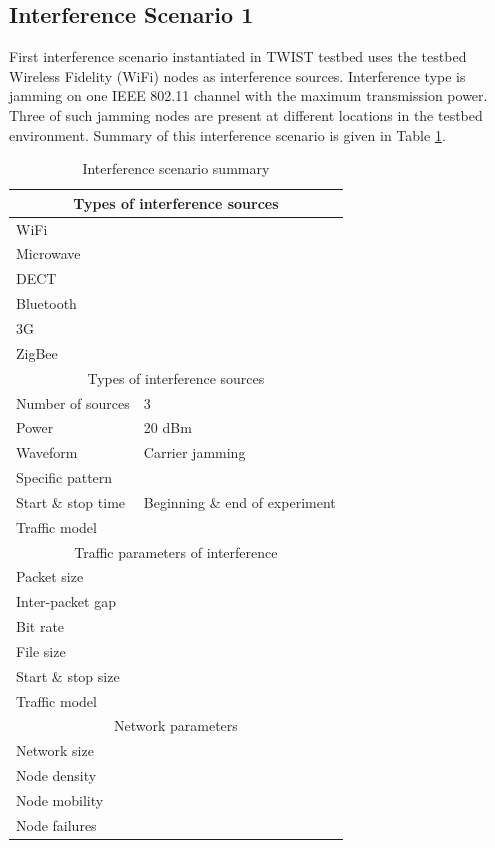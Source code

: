 \documentclass[11pt,a4paper,headinclude,footinclude,chapterprefix=on]{scrreprt}
\begin{document}
\subsection{Interference Scenario 1} First interference scenario instantiated in TWIST testbed uses the testbed Wireless Fidelity (WiFi) nodes as interference sources. Interference type is jamming on one IEEE 802.11 channel with the maximum transmission power. Three of such jamming nodes are present at different locations in the testbed environment. Summary of this interference scenario is given in Table \ref{tb:interf:1}. 
\begin{table}
	[h] \centering \caption{Interference scenario summary} \label{tb:interf:1} 
	\begin{tabular}
		{|l|l|} \hline \multicolumn{2}{|c|}{Types of interference sources} \\
		\hline WiFi & \checkmark \\
		Microwave & \texttimes \\
		DECT & \texttimes \\
		Bluetooth & \texttimes \\
		3G & \texttimes \\
		ZigBee & \texttimes \\
		\hline \multicolumn{2}{|c|}{Types of interference sources} \\
		\hline Number of sources & 3 \\
		Power & 20 dBm \\
		Waveform & Carrier jamming \\
		Specific pattern & \\
		Start \& stop time & Beginning \& end of experiment \\
		Traffic model & \\
		\hline \multicolumn{2}{|c|}{Traffic parameters of interference} \\
		\hline Packet size & \\
		Inter-packet gap & \\
		Bit rate & \\
		File size & \\
		Start \& stop size & \\
		Traffic model & \\
		\hline \multicolumn{2}{|c|}{Network parameters} \\
		\hline Network size & \\
		Node density & \\
		Node mobility & \\
		Node failures & \\
		\hline 
	\end{tabular}
\end{table}
\end{document}
